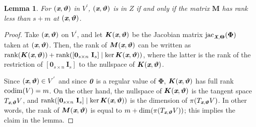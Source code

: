 \documentclass[a4paper]{article}
\def\bz{\textit{\textbf{0}}}
\def\Xb{\textit{\textbf{X}}}
\def\Thetab{\bm{\Theta}}
\def\thetab{\bm{\vartheta}}
\def\xb{\textit{\textbf{x}}}
\DeclareMathOperator{\jac}{jac}
\def\dt{s}
\newtheorem{lemma}[theorem]{Lemma}
\begin{document}
    \begin{lemma} 
      For $(\xb,\thetab)$ in $V^{'}$, $(\xb,\thetab)$ is in $Z$ if and only if
      the matrix $\bm M$ has rank less than $\dt+m$ at $(\xb,\thetab)$.
    \end{lemma}
    \begin{proof}
      Take $(\xb,\thetab)$ on $V^{'}$, and let $\bm K(\xb,\thetab)$ be the
      Jacobian matrix $\jac_{\Xb,\Thetab}(\bm\Phi)$ taken at $(\xb,\thetab)$.
      Then, the rank of $\bm M(\xb,\thetab)$ can be written as
      $\textup{rank}(\bm K(\xb,\thetab)) + \textup{rank}([\textbf{0}_{\dt
          \times n}~\textbf{I}_{\dt}] \mid \ker \bm K(\xb,\thetab))$, where
      the latter is the rank of the restriction of $[\textbf{0}_{\dt
          \times n}~\textbf{I}_{\dt}]$ to the nullspace of
      $\bm K(\xb,\thetab)$.
    
      Since $(\xb,\thetab) \in V^{'}$ and since $\bz$ is a regular value of $\bm \Phi$, $\bm K(\xb,\thetab)$ has full rank ${\rm codim}
      (V) = m$. On the other hand, the nullspace of $\bm K(\xb,\thetab)$
      is the tangent space $T_{\xb,\thetab} V$, and
      $\textup{rank}([\textbf{0}_{\dt \times n}~\textbf{I}_{\dt}] \mid
      \ker \bm K(\xb,\thetab))$ is the dimension of $\pi(T_{\xb,\thetab}
      V)$.  In other words, the rank of $\bm M(\xb,\thetab)$ is equal to
      $m+\dim(\pi(T_{\xb,\thetab} V))$; this implies the claim in the
      lemma.
    \end{proof}
\end{document}
